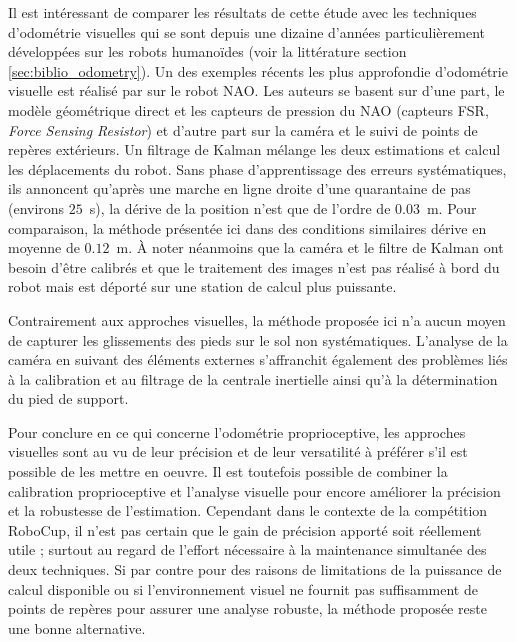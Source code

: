 Il est intéressant de comparer les résultats de cette étude avec les techniques d'odométrie visuelles
qui se sont depuis une dizaine d'années particulièrement développées sur les robots humanoïdes 
(voir la littérature section \ref{sec:biblio_odometry}).
Un des exemples récents les plus approfondie d'odométrie visuelle est 
réalisé par \cite{oriolo_humanoid_2016} sur le robot NAO.
Les auteurs se basent sur d'une part, le modèle géométrique direct et les capteurs
de pression du NAO (capteurs FSR, \textit{Force Sensing Resistor}) et d'autre part 
sur la caméra et le suivi de points de repères extérieurs. 
Un filtrage de Kalman mélange les deux estimations et calcul les déplacements du robot.
Sans phase d'apprentissage des erreurs systématiques, 
ils annoncent qu'après une marche en ligne droite 
d'une quarantaine de pas (environs $25$~s), la dérive de la position n'est que de l'ordre de $0.03$~m.
Pour comparaison, la méthode présentée ici dans des conditions similaires 
dérive en moyenne de $0.12$~m.
À noter néanmoins que la caméra et le filtre de Kalman ont besoin d'être calibrés et que 
le traitement des images n'est pas réalisé à bord du robot mais est déporté sur une 
station de calcul plus puissante.

Contrairement aux approches visuelles, la méthode proposée ici n'a aucun moyen de capturer
les glissements des pieds sur le sol non systématiques.
L'analyse de la caméra en suivant des éléments externes s'affranchit également des problèmes
liés à la calibration et au filtrage de la centrale inertielle ainsi qu'à la détermination 
du pied de support.

Pour conclure en ce qui concerne l'odométrie proprioceptive, les approches visuelles 
sont au vu de leur précision et de leur versatilité à préférer 
s'il est possible de les mettre en oeuvre.
Il est toutefois possible de combiner la calibration proprioceptive 
et l'analyse visuelle pour encore améliorer la précision et la robustesse de l'estimation.
Cependant dans le contexte de la compétition RoboCup,
il n'est pas certain que le gain de précision apporté soit réellement utile ; 
surtout au regard de l'effort nécessaire à la maintenance simultanée des deux techniques.
Si par contre pour des raisons de limitations de la puissance de calcul disponible 
ou si l'environnement visuel ne fournit pas suffisamment de points de repères pour 
assurer une analyse robuste, la méthode proposée reste une bonne alternative.

